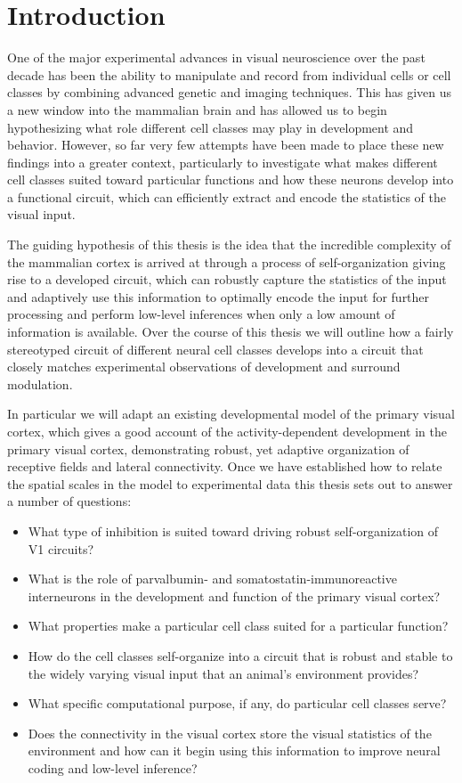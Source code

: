 \chapter{Introduction}

One of the major experimental advances in visual neuroscience over the
past decade has been the ability to manipulate and record from
individual cells or cell classes by combining advanced genetic and
imaging techniques. This has given us a new window into the mammalian
brain and has allowed us to begin hypothesizing what role different
cell classes may play in development and behavior. However, so far
very few attempts have been made to place these new findings into a
greater context, particularly to investigate what makes different cell
classes suited toward particular functions and how these neurons
develop into a functional circuit, which can efficiently extract and
encode the statistics of the visual input.

The guiding hypothesis of this thesis is the idea that the incredible
complexity of the mammalian cortex is arrived at through a process of
self-organization giving rise to a developed circuit, which can
robustly capture the statistics of the input and adaptively use this
information to optimally encode the input for further processing and
perform low-level inferences when only a low amount of information is
available. Over the course of this thesis we will outline how a fairly
stereotyped circuit of different neural cell classes develops into a
circuit that closely matches experimental observations of development
and surround modulation.

In particular we will adapt an existing developmental model of the
primary visual cortex, which gives a good account of the
activity-dependent development in the primary visual cortex,
demonstrating robust, yet adaptive organization of receptive fields
and lateral connectivity. Once we have established how to relate the
spatial scales in the model to experimental data this thesis sets out
to answer a number of questions:

\begin{itemize}
\item What type of inhibition is suited toward driving robust
  self-organization of V1 circuits?
\item What is the role of parvalbumin- and somatostatin-immunoreactive
  interneurons in the development and function of the primary visual
  cortex?
\item What properties make a particular cell class suited for a
  particular function?
\item How do the cell classes self-organize into a circuit that is
  robust and stable to the widely varying visual input that an
  animal's environment provides?
\item What specific computational purpose, if any, do particular cell
  classes serve?
\item Does the connectivity in the visual cortex store the visual
  statistics of the environment and how can it begin using this
  information to improve neural coding and low-level inference?
\end{itemize}

